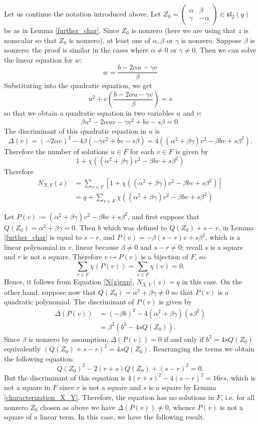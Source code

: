\documentclass[preprint,11pt]{amsart}
\theoremstyle{definition}
\numberwithin{thm}{section}
\newcommand{\gam}{\gamma}
\def\sl{\mathfrak{sl}}
\newcommand{\al}{\alpha}
\begin{document}
Let us continue the notation introduced above. Let $Z_0 = \begin{pmatrix} \al & \beta  \\ \gamma  & - \alpha \end{pmatrix} \in \sl_2(q)$ be as in Lemma \ref{further_char}. Since $Z_0$ is nonzero (here we are using that $z$ is nonscalar so that $Z_0$ is nonzero), at least one of $\al, \beta$ or $\gam$ is nonzero. Suppose $\beta$ is nonzero; the proof is similar in the cases where $\al \neq 0$ or $\gamma \neq 0$. Then we can solve the linear equation for $w$:
$$
w = \frac{b  - 2 \al u  - \gam v}{\beta}
$$
Substituting into the quadratic equation, we get
$$
u^2 + v \left( \frac{b- 2 \al u - \gam v}{ \beta} \right) = s
$$
so that we obtain a quadratic equation in two variables $u$ and $v$:
$$
\beta u^2  - 2 \al u v  - \gam v^2 + b v - s \beta = 0.
$$
The discriminant of this quadratic equation in $u$ is 
$$
\Delta(v) = (-2 \al v)^2 - 4 \beta (- \gam v^2 + b v - s \beta) = 4 ( (\al^2 + \beta \gam) v^2 - \beta b v + s \beta^2).
$$
Therefore the number of solutions $u \in F$ for each $v \in F$ is given by 
$$
1 + \chi( (\al^2 + \beta \gam) v^2  - \beta bv + s\beta^2)
$$
Therefore 
\begin{align}\label{N(z)exp}
N_{X, Y}(z) &= \sum_{v \in F} \left[ 1 + \chi( (\al^2 + \beta \gam) v^2  - \beta bv + s\beta^2) \right] \nonumber \\
&= q + \sum_{v \in F}  \chi( (\al^2 + \beta \gam) v^2  - \beta bv + s\beta^2)
\end{align}

Let $P(v) := (\al^2 + \beta \gam) v^2  - \beta bv + s\beta^2$, and first suppose that $Q(Z_0) = \al^2 + \beta \gam = 0$. Then $b$ which was defined to $Q(Z_0) + s -r$, in Lemma \ref{further_char} is equal to $s - r$, and $P(v) = - \beta(s-r)v+ s \beta^2$, which is a linear polynomial in $v$, linear because $\beta \neq 0$ and $s-r \neq 0$; recall $s$ is a square and $r$ is not a square. Therefore $v \mapsto P(v)$ is a bijection of $F$, so 
$$
\sum_{v \in F} \chi(P(v)) = \sum_{v \in F} \chi(v) = 0.
$$ 
Hence, it follows from Equation \ref{N(z)exp}, $N_{X, Y}(z) = q$ in this case. On the other hand,  suppose now that $Q(Z_0) = \al^2 + \beta \gam \neq 0$ so that $P(v)$ is a quadratic polynomial. The discriminant of $P(v)$ is given by  
\begin{align*}
\Delta(P(v)) &= (-\beta b)^2 - 4 ( \al^2 + \beta \gam) (s \beta^2) \\
& = \beta^2(b^2 - 4s Q(Z_0)).
\end{align*} 
 Since $\beta$ is nonzero by assumption, $\Delta(P(v)) = 0$ if and only if $b^2 = 4s Q(Z_0)$ equivalently $(Q(Z_0) + s - r)^2 = 4s Q(Z_0)$. Rearranging the terms we obtain the following equation:
$$
Q(Z_0)^2 - 2 (r + s) Q(Z_0) + (s-r)^2 = 0.
$$
But the discriminant of this equation is $4(r+s)^2 - 4 (s-r)^2 = 16rs$, which is not a square in $F$ since $r$ is not a square and $s$ is a square by Lemma \ref{characterization_X_Y}. Therefore, the equation has no solutions in $F$, i.e. for all nonzero $Z_0$ chosen as above we have $\Delta(P(v)) \neq 0$, whence $P(v)$ is not a square of a linear term. In this case, we have the following result. 
\end{document}
